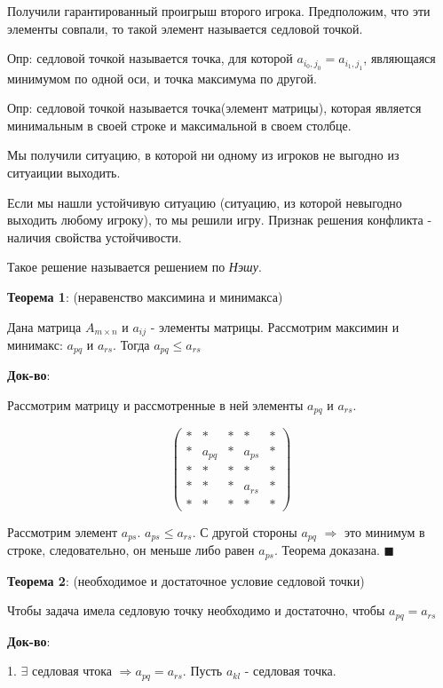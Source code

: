 \documentclass[aps,%
12pt,%
final,%
oneside,
onecolumn,%
musixtex, %
superscriptaddress,%
centertags]{article} %
\begin{document}
Получили гарантированный проигрыш второго игрока. 
Предположим, что эти элементы совпали, то такой элемент называется седловой точкой.

Опр: седловой точкой называется точка, для которой $a_{i_0,j_0} = a_{i_1,j_1}$, являющаяся минимумом по одной оси, и точка максимума по другой.

Опр: седловой точкой называется точка(элемент матрицы), которая является минимальным в своей строке и максимальной в своем столбце.

Мы получили ситуацию, в которой ни одному из игроков не выгодно из ситуаиции выходить.

Если мы нашли устойчивую ситуацию (ситуацию, из которой невыгодно выходить любому игроку), то мы решили игру. Признак решения конфликта - наличия свойства устойчивости.

Такое решение называется решением по \textit {Нэшу}.

\textbf{Теорема 1}: (неравенство максимина и минимакса)

Дана матрица $A_{m \times n}$ и $a_{ij}$ - элементы матрицы. Рассмотрим максимин и минимакс: $a_{pq}$ и $a_{rs}$. Тогда $a_{pq} \leq a_{rs}$

\textbf{Док-во}:

Рассмотрим матрицу и рассмотренные в ней элементы $a_{pq}$ и $ a_{rs}$.

$$\begin{pmatrix}
	
 *  & * &  *  & *  & * \\ 
 * &a_{pq} &*  &a_{ps} &* \\ 
 *  & *  & *  & *  & * \\ 
 * & * & * & a_{rs} &  * \\ 
 * & * & * & * & * 

\end{pmatrix}$$

Рассмотрим элемент $a_{ps}$. $a_{ps} \leq a_{rs}$. С другой стороны $a_{pq}$ $\Rightarrow$ это минимум в строке, следовательно, он меньше либо равен $a_{ps}$. Теорема доказана. $\blacksquare$

\textbf{Теорема 2}: (необходимое и достаточное условие седловой точки)

Чтобы задача имела седловую точку необходимо и достаточно, чтобы $a_{pq} = a_{rs} $

\textbf{Док-во}:

1. $\exists$  седловая чтока $\Rightarrow a_{pq} = a_{rs}$. Пусть $ a_{kl}$ - седловая точка.
\end{document}
